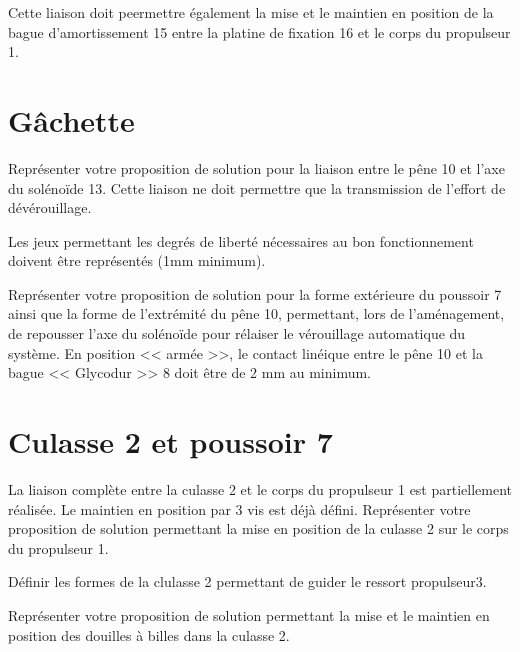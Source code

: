 \documentclass[11pt]{article}
\begin{document}
Cette liaison doit peermettre également la mise et le maintien en position de la bague d'amortissement 15 entre la platine de fixation 16 et le corps du propulseur 1. 

\begin{UPSTIcorrige}
\end{UPSTIcorrige}

\section{Gâchette}

\UPSTIquestion* Représenter votre proposition de solution pour la liaison entre le pêne 10 et l'axe du solénoïde 13. Cette liaison ne doit permettre que la transmission de l'effort de dévérouillage. 

Les jeux permettant les degrés de liberté nécessaires au bon fonctionnement doivent être représentés (1mm minimum). 
\begin{UPSTIcorrige}
\end{UPSTIcorrige}

\UPSTIquestion Représenter votre proposition de solution pour la forme extérieure du poussoir 7 ainsi que la forme de l'extrémité du pêne 10, permettant, lors de l'aménagement, de repousser l'axe du solénoïde pour rélaiser le vérouillage automatique du système. En position << armée >>, le contact linéique entre le pêne 10 et la bague << Glycodur >> 8 doit être de 2 mm au minimum.
\begin{UPSTIcorrige}
\end{UPSTIcorrige}

\section{Culasse 2 et poussoir 7}

\UPSTIquestion* La liaison complète entre la culasse 2 et le corps du propulseur 1 est partiellement réalisée. Le maintien en position par 3 vis est déjà défini. Représenter votre proposition de solution permettant la mise en position de la culasse 2 sur le corps du propulseur 1. 
\begin{UPSTIcorrige}
\end{UPSTIcorrige}

\UPSTIquestion Définir les formes de la clulasse 2 permettant de guider le ressort propulseur3.
\begin{UPSTIcorrige}
\end{UPSTIcorrige}

\UPSTIquestion Représenter votre proposition de solution permettant la mise et le maintien en position des douilles à billes dans la culasse 2. 
\begin{UPSTIcorrige}
\end{UPSTIcorrige}
\end{document}
